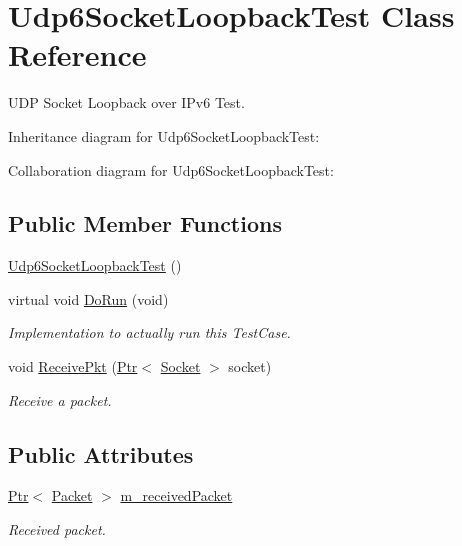 \hypertarget{classUdp6SocketLoopbackTest}{}\section{Udp6\+Socket\+Loopback\+Test Class Reference}
\label{classUdp6SocketLoopbackTest}


U\+DP Socket Loopback over I\+Pv6 Test.  




Inheritance diagram for Udp6\+Socket\+Loopback\+Test\+:


Collaboration diagram for Udp6\+Socket\+Loopback\+Test\+:
\subsection*{Public Member Functions}
\begin{DoxyCompactItemize}
\item 
\hyperlink{classUdp6SocketLoopbackTest_a47d174bdb09a9c4cb7c277ada753ea50}{Udp6\+Socket\+Loopback\+Test} ()
\item 
virtual void \hyperlink{classUdp6SocketLoopbackTest_a2f3bfecef9b06651dcba30458f1853c1}{Do\+Run} (void)
\begin{DoxyCompactList}\small\item\em Implementation to actually run this Test\+Case. \end{DoxyCompactList}\item 
void \hyperlink{classUdp6SocketLoopbackTest_a5bcb3750d6e5e37f16ca0792554ad15a}{Receive\+Pkt} (\hyperlink{classns3_1_1Ptr}{Ptr}$<$ \hyperlink{classns3_1_1Socket}{Socket} $>$ socket)
\begin{DoxyCompactList}\small\item\em Receive a packet. \end{DoxyCompactList}\end{DoxyCompactItemize}
\subsection*{Public Attributes}
\begin{DoxyCompactItemize}
\item 
\hyperlink{classns3_1_1Ptr}{Ptr}$<$ \hyperlink{classns3_1_1Packet}{Packet} $>$ \hyperlink{classUdp6SocketLoopbackTest_a9affdeec8230cec75b8315a0ce0def49}{m\+\_\+received\+Packet}
\begin{DoxyCompactList}\small\item\em Received packet. \end{DoxyCompactList}\end{DoxyCompactItemize}
